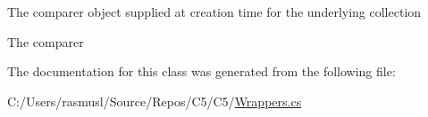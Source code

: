 The comparer object supplied at creation time for the underlying collection 

The comparer

The documentation for this class was generated from the following file\+:\begin{DoxyCompactItemize}
\item 
C\+:/\+Users/rasmusl/\+Source/\+Repos/\+C5/\+C5/\hyperlink{_wrappers_8cs}{Wrappers.\+cs}\end{DoxyCompactItemize}
